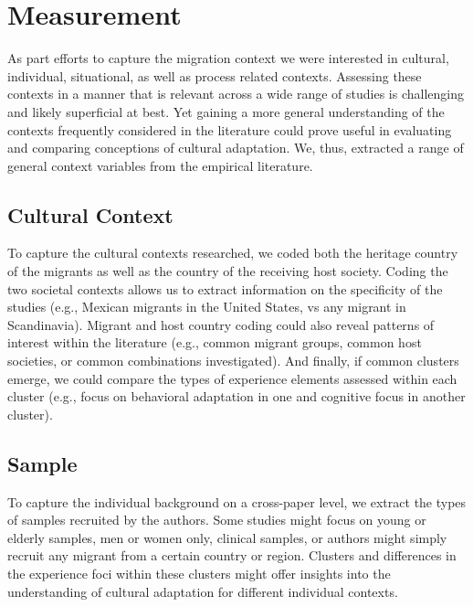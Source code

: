 \documentclass[man, 12pt, a4paper]{apa7}
\begin{document}
\section{Measurement}
As part efforts to capture the migration context we were interested in cultural, individual, situational, as well as process related contexts. Assessing these contexts in a manner that is relevant across a wide range of studies is challenging and likely superficial at best. Yet gaining a more general understanding of the contexts frequently considered in the literature could prove useful in evaluating and comparing conceptions of cultural adaptation. We, thus, extracted a range of general context variables from the empirical literature.

\subsection{Cultural Context}
To capture the cultural contexts researched, we coded both the heritage country of the migrants as well as the country of the receiving host society. Coding the two societal contexts allows us to extract information on the specificity of the studies (e.g., Mexican migrants in the United States, vs any migrant in Scandinavia). Migrant and host country coding could also reveal patterns of interest within the literature (e.g., common migrant groups, common host societies, or common combinations investigated). And finally, if common clusters emerge, we could compare the types of experience elements assessed within each cluster (e.g., focus on behavioral adaptation in one and cognitive focus in another cluster). 

\subsection{Sample}
To capture the individual background on a cross-paper level, we extract the types of samples recruited by the authors. Some studies might focus on young or elderly samples, men or women only, clinical samples, or authors might simply recruit any migrant from a certain country or region. Clusters and differences in the experience foci within these clusters might offer insights into the understanding of cultural adaptation for different individual contexts.
\end{document}
